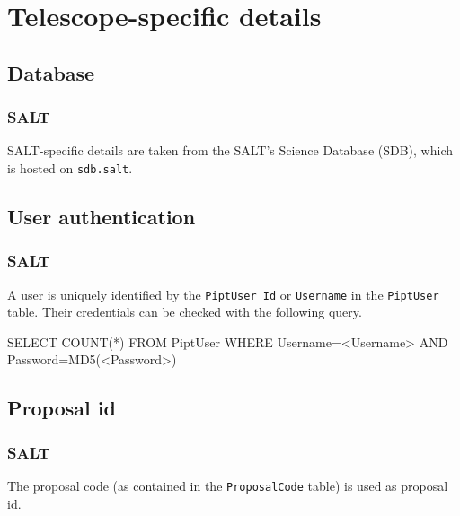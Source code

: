 \section{Telescope-specific details}
\label{app:telescopes}

\subsection{Database}

\subsubsection{SALT}

SALT-specific details are taken from the SALT's Science Database (SDB), which is hosted on \verb|sdb.salt|.

\subsection{User authentication}

\subsubsection{SALT}

A user is uniquely identified by the \verb|PiptUser_Id| or \verb|Username| in the \verb|PiptUser| table. Their credentials can be checked with the following query.

\begin{code}
SELECT COUNT(*) FROM PiptUser
       WHERE Username=<Username> AND Password=MD5(<Password>)
\end{code}

\subsection{Proposal id}

\subsubsection{SALT}

The proposal code (as contained in the \verb|ProposalCode| table) is used as proposal id.